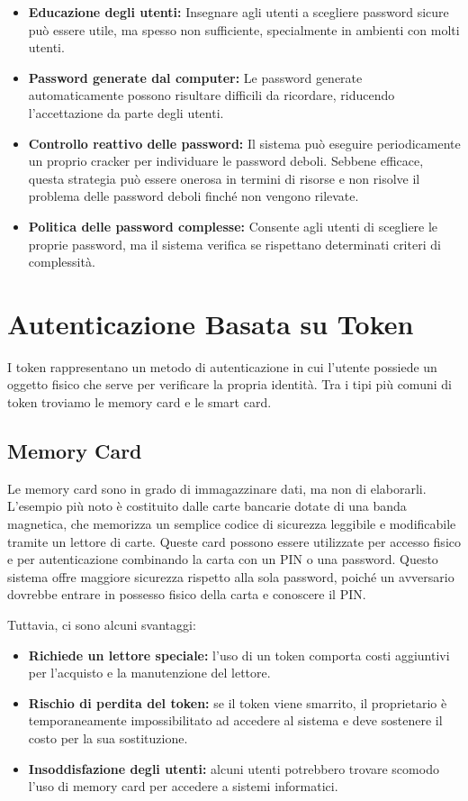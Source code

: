 \begin{itemize}
    \item \textbf{Educazione degli utenti:} Insegnare agli utenti a scegliere password sicure può essere utile, ma spesso non sufficiente, specialmente in ambienti con molti utenti.
    \item \textbf{Password generate dal computer:} Le password generate automaticamente possono risultare difficili da ricordare, riducendo l'accettazione da parte degli utenti.
    \item \textbf{Controllo reattivo delle password:} Il sistema può eseguire periodicamente un proprio cracker per individuare le password deboli. Sebbene efficace, questa strategia può essere onerosa in termini di risorse e non risolve il problema delle password deboli finché non vengono rilevate.
    \item \textbf{Politica delle password complesse:} Consente agli utenti di scegliere le proprie password, ma il sistema verifica se rispettano determinati criteri di complessità.
\end{itemize}

\section{Autenticazione Basata su Token}

I token rappresentano un metodo di autenticazione in cui l'utente possiede un oggetto fisico che serve per verificare la propria identità. Tra i tipi più comuni di token troviamo le memory card e le smart card.

\subsection{Memory Card}

Le memory card sono in grado di immagazzinare dati, ma non di elaborarli. L'esempio più noto è costituito dalle carte bancarie dotate di una banda magnetica, che memorizza un semplice codice di sicurezza leggibile e modificabile tramite un lettore di carte. Queste card possono essere utilizzate per accesso fisico e per autenticazione combinando la carta con un PIN o una password. Questo sistema offre maggiore sicurezza rispetto alla sola password, poiché un avversario dovrebbe entrare in possesso fisico della carta e conoscere il PIN.

Tuttavia, ci sono alcuni svantaggi:

\begin{itemize}
    \item \textbf{Richiede un lettore speciale:} l'uso di un token comporta costi aggiuntivi per l'acquisto e la manutenzione del lettore.
    \item \textbf{Rischio di perdita del token:} se il token viene smarrito, il proprietario è temporaneamente impossibilitato ad accedere al sistema e deve sostenere il costo per la sua sostituzione.
    \item \textbf{Insoddisfazione degli utenti:} alcuni utenti potrebbero trovare scomodo l'uso di memory card per accedere a sistemi informatici.
\end{itemize}

